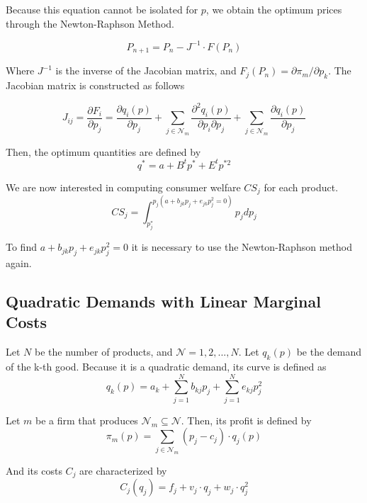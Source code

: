 \documentclass[12pt]{article}
\begin{document}
Because this equation cannot be isolated for $p$, we obtain the optimum prices through the Newton-Raphson Method.

\begin{equation*}
P_{n+1} = P_n - J^{-1} \cdot F(P_n)
\end{equation*}

Where $J^{-1}$ is the inverse of the Jacobian matrix, and $F_j(P_n) = \partial \pi_m / \partial p_k$. The Jacobian matrix is constructed as follows

\begin{equation}
J_{ij} = \frac{\partial F_i}{\partial p_j} = \frac{\partial q_i(p)}{\partial p_j} + \sum_{j \in \mathcal{N}_m} \frac{\partial^2 q_i(p)}{\partial p_i \partial p_j} + \sum_{j \in \mathcal{N}_m} \frac{\partial q_i(p)}{\partial p_j}
\end{equation}

Then, the optimum quantities are defined by 
\begin{equation*}
q^* = a + B^t p^* + E^t p^{*2}
\end{equation*}

We are now interested in computing consumer welfare $CS_j$ for each product.
\begin{equation*}
CS_j = \int_{p_j^*}^{p_j(a + b_{jk} p_j + e_{jk} p_j^2 = 0)} p_j dp_j
\end{equation*}

To find $a + b_{jk} p_j + e_{jk} p_j^2 = 0$ it is necessary to use the Newton-Raphson method again. 

\subsection{Quadratic Demands with Linear Marginal Costs}

Let $N$ be the number of products, and $\mathcal{N} = 1, 2, ..., N$. Let $q_k(p)$ be the demand of the k-th good. Because it is a quadratic demand, its curve is defined as
\begin{equation*}
q_k(p) = a_k + \sum_{j = 1}^N b_{kj} p_j + \sum_{j = 1}^N e_{kj}p_j^2
\end{equation*}

Let $m$ be a firm that produces $\mathcal{N}_m \subseteq \mathcal{N}$. Then, its profit is defined by
\begin{equation*}
\pi_m(p) = \sum_{j \in \mathcal{N}_m} (p_j - c_j) \cdot q_j(p)
\end{equation*}

And its costs $C_j$ are characterized by
\begin{equation*}
C_j(q_j) = f_j + v_j \cdot q_j + w_j \cdot q_j^2
\end{equation*}
\end{document}
